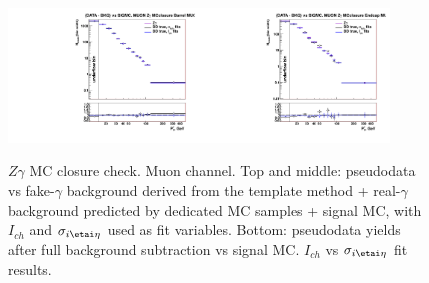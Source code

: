 \begin{figure}[htb]
\begin{center}
\includegraphics[width=0.45\textwidth]{../figs/figs_v11/MUON_ZGamma/PrepareYields/c_BkgSubtrDATAvsSIGMC_c_MUON_ZGamma__UNblind_MCclosure__Barrel__phoEt_MCclosure.pdf}\includegraphics[width=0.45\textwidth]{../figs/figs_v11/MUON_ZGamma/PrepareYields/c_BkgSubtrDATAvsSIGMC_c_MUON_ZGamma__UNblind_MCclosure__Endcap__phoEt_MCclosure.pdf}\\
  \caption{$Z\gamma$ MC closure check. Muon channel. Top and middle: pseudodata vs fake-$\gamma$ background derived from the template method + real-$\gamma$ background predicted by dedicated MC samples + signal MC, with $I_{ch}$ and $\sigma_{i\etai\eta}$ used as fit variables. Bottom: pseudodata yields after full background subtraction vs signal MC. $I_{ch}$ vs $\sigma_{i\etai\eta}$ fit results. }
  \label{fig:DDvsMC_Zg_MCclosure_MUON}
  \end{center}
\end{figure}

